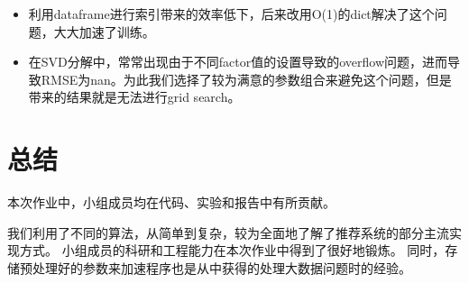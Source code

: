\begin{itemize}
	\item 利用dataframe进行索引带来的效率低下，后来改用O(1)的dict解决了这个问题，大大加速了训练。
	\item 在SVD分解中，常常出现由于不同factor值的设置导致的overflow问题，进而导致RMSE为nan。为此我们选择了较为满意的参数组合来避免这个问题，但是带来的结果就是无法进行grid search。
\end{itemize}

\section{总结}

本次作业中，小组成员均在代码、实验和报告中有所贡献。

我们利用了不同的算法，从简单到复杂，较为全面地了解了推荐系统的部分主流实现方式。
小组成员的科研和工程能力在本次作业中得到了很好地锻炼。
同时，存储预处理好的参数来加速程序也是从中获得的处理大数据问题时的经验。